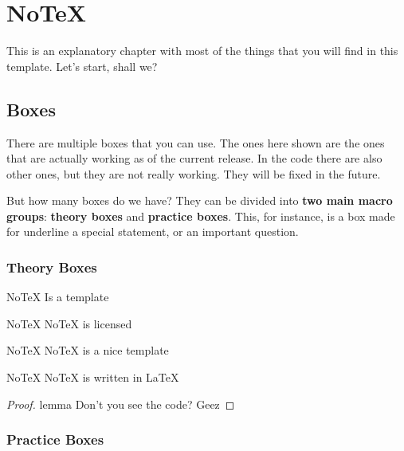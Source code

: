\chapter{NoTeX}

\noindent This is an explanatory chapter with most of the things that you will find in this template. Let's start, shall we?

\section{Boxes}

\noindent There are multiple boxes that you can use. The ones here shown are the ones that are actually working as of the current release. In the code there are also other ones, but they are not really working. They will be fixed in the future.

\begin{question}
    But how many boxes do we have? They can be divided into \textbf{two main macro groups}: \textbf{theory boxes} and \textbf{practice boxes}. This, for instance, is a box made for underline a special statement, or an important question.
\end{question}

\subsection{Theory Boxes}

\begin{definition}{NoTeX}
    Is a template
\end{definition}

\begin{corollary}{NoTeX}
    NoTeX is licensed
\end{corollary}

\begin{theorem}{NoTeX}
    NoTeX is a nice template
\end{theorem}

\begin{lemma}{NoTeX}
    NoTeX is written in \LaTeX
    \\
\end{lemma}

\begin{proof}{lemma}
    Don't you see the code? Geez
\end{proof}

\subsection{Practice Boxes}


